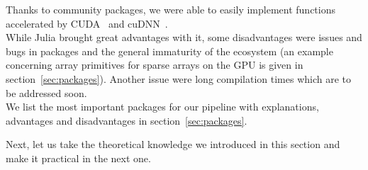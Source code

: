 Thanks to community packages, we were able to easily implement
functions accelerated by CUDA~\cite{CUDAToolkit2013} and
cuDNN~\cite{NVIDIACuDNN2014}. \\
While Julia brought great advantages with it, some disadvantages were
issues and bugs in packages and the general immaturity of the
ecosystem (an example concerning array primitives for sparse arrays on
the GPU is given in section~\ref{sec:packages}). Another issue were
long compilation times which are to be addressed soon. \\
We list the most important packages for our pipeline with
explanations, advantages and disadvantages in
section~\ref{sec:packages}.

Next, let us take the theoretical knowledge we introduced in this
section and make it practical in the next one.


